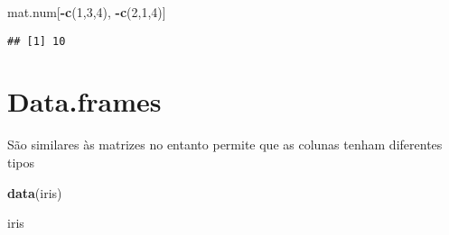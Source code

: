 \documentclass[]{article}
\newenvironment{Shaded}{\begin{snugshade}}{\end{snugshade}}
\newcommand{\KeywordTok}[1]{\textcolor[rgb]{0.13,0.29,0.53}{\textbf{#1}}}
\newcommand{\DecValTok}[1]{\textcolor[rgb]{0.00,0.00,0.81}{#1}}
\newcommand{\OperatorTok}[1]{\textcolor[rgb]{0.81,0.36,0.00}{\textbf{#1}}}
\newcommand{\NormalTok}[1]{#1}
\begin{document}
\begin{Shaded}
\begin{Highlighting}[]
\NormalTok{mat.num[}\OperatorTok{-}\KeywordTok{c}\NormalTok{(}\DecValTok{1}\NormalTok{,}\DecValTok{3}\NormalTok{,}\DecValTok{4}\NormalTok{), }\OperatorTok{-}\KeywordTok{c}\NormalTok{(}\DecValTok{2}\NormalTok{,}\DecValTok{1}\NormalTok{,}\DecValTok{4}\NormalTok{)]}
\end{Highlighting}
\end{Shaded}

\begin{verbatim}
## [1] 10
\end{verbatim}

\section{Data.frames}\label{data.frames}

São similares às matrizes no entanto permite que as colunas tenham
diferentes tipos

\begin{Shaded}
\begin{Highlighting}[]
\KeywordTok{data}\NormalTok{(iris)}

\NormalTok{iris}
\end{Highlighting}
\end{Shaded}
\end{document}
